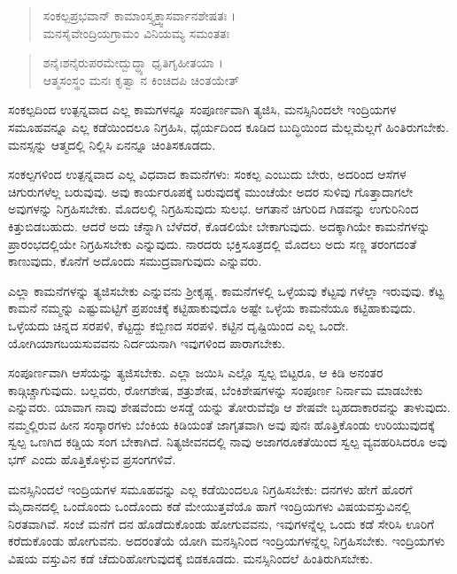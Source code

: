 \begin{verse}
ಸಂಕಲ್ಪಪ್ರಭವಾನ್ ಕಾಮಾಂಸ್ತ್ಯಕ್ತ್ವಾಸರ್ವಾನಶೇಷತಃ ।\\ಮನಸೈವೇಂದ್ರಿಯಗ್ರಾಮಂ ವಿನಿಯಮ್ಯ ಸಮಂತತಃ 
\end{verse}

\begin{verse}
ಶನೈಃಶನೈರುಪರಮೇದ್ಬುದ್ಧ್ಯಾ ಧೃತಿಗೃಹೀತಯಾ ।\\ಆತ್ಮಸಂಸ್ಥಂ ಮನಃ ಕೃತ್ವಾ ನ ಕಿಂಚಿದಪಿ ಚಿಂತಯೇತ್ 
\end{verse}

{\small ಸಂಕಲ್ಪದಿಂದ ಉತ್ಪನ್ನವಾದ ಎಲ್ಲ ಕಾಮಗಳನ್ನೂ ಸಂಪೂರ್ಣವಾಗಿ ತ್ಯಜಿಸಿ, ಮನಸ್ಸಿನಿಂದಲೇ ಇಂದ್ರಿಯಗಳ ಸಮೂಹವನ್ನೂ ಎಲ್ಲ ಕಡೆಯಿಂದಲೂ ನಿಗ್ರಹಿಸಿ, ಧೈರ್ಯದಿಂದ ಕೂಡಿದ ಬುದ್ಧಿಯಿಂದ ಮೆಲ್ಲಮೆಲ್ಲಗೆ ಹಿಂತಿರುಗಬೇಕು. ಮನಸ್ಸನ್ನು ಆತ್ಮದಲ್ಲಿ ನಿಲ್ಲಿಸಿ ಏನನ್ನೂ ಚಿಂತಿಸಕೂಡದು.}

ಸಂಕಲ್ಪಗಳಿಂದ ಉತ್ಪನ್ನವಾದ ಎಲ್ಲ ವಿಧವಾದ ಕಾಮನೆಗಳು: ಸಂಕಲ್ಪ ಎಂಬುದು ಬೇರು, ಅದರಿಂದ ಆಸೆಗಳ ಚಿಗುರುಗಳೆಲ್ಲ ಬರುವುವು. ಅವು ಕಾರ್ಯರೂಪಕ್ಕೆ ಬರುವುದಕ್ಕೆ ಮುಂಚೆಯೇ ಅದರ ಸುಳಿವು ಗೊತ್ತಾದಾಗಲೇ ಅವುಗಳನ್ನು ನಿಗ್ರಹಿಸಬೇಕು. ಮೊದಲಲ್ಲಿ ನಿಗ್ರಹಿಸುವುದು ಸುಲಭ. ಆಗತಾನೆ ಚಿಗುರಿದ ಗಿಡವನ್ನು ಉಗುರಿನಿಂದ ಕಿತ್ತುಬಿಡಬಹುದು. ಆದರೆ ಅದು ಚೆನ್ನಾಗಿ ಬೆಳೆದರೆ, ಕೊಡಲಿಯೇ ಬೇಕಾಗುವುದು. ಅದಕ್ಕಾಗಿಯೇ ಕಾಮನೆಗಳನ್ನು ಪ್ರಾರಂಭದಲ್ಲಿಯೇ ನಿಗ್ರಹಿಸಬೇಕು ಎನ್ನುವುದು. ನಾರದರು ಭಕ್ತಿಸೂತ್ರದಲ್ಲಿ ಮೊದಲು ಅದು ಸಣ್ಣ ತರಂಗದಂತೆ ಕಾಣುವುದು, ಕೊನೆಗೆ ಅದೊಂದು ಸಮುದ್ರವಾಗುವುದು ಎನ್ನುವರು.

ಎಲ್ಲಾ ಕಾಮನೆಗಳನ್ನು ತ್ಯಜಿಸಬೇಕು ಎನ್ನುವನು ಶ್ರೀಕೃಷ್ಣ. ಕಾಮನೆಗಳಲ್ಲಿ ಒಳ್ಳೆಯವು ಕೆಟ್ಟವು ಗಳೆಲ್ಲಾ ಇರುವುವು. ಕೆಟ್ಟ ಕಾಮನೆ ನಮ್ಮನ್ನು ಎಷ್ಟುಮಟ್ಟಿಗೆ ಪ್ರಪಂಚಕ್ಕೆ ಕಟ್ಟಿಹಾಕುವುದೊ ಅಷ್ಟೇ ಒಳ್ಳೆಯ ಕಾಮನೆಯೂ ಕಟ್ಟಿಹಾಕುವುದು. ಒಳ್ಳೆಯದು ಚಿನ್ನದ ಸರಪಳಿ, ಕೆಟ್ಟದ್ದು ಕಬ್ಬಿಣದ ಸರಪಳಿ. ಕಟ್ಟಿನ ದೃಷ್ಟಿಯಿಂದ ಎಲ್ಲ ಒಂದೇ. ಯೋಗಿಯಾಗಬಯಸುವವನು ನಿರ್ದಯನಾಗಿ ಇವುಗಳಿಂದ ಪಾರಾಗಬೇಕು.

ಸಂಪೂರ್ಣವಾಗಿ ಆಸೆಯನ್ನು ತ್ಯಜಿಸಬೇಕು. ಎಲ್ಲಾ ಜಯಿಸಿ ಎಲ್ಲೊ ಸ್ವಲ್ಪ ಬಿಟ್ಟರೂ, ಆ ಕಿಡಿ ಅನಂತರ ಕಾಡ್ಗಿಚ್ಚಾಗುವುದು. ಬಲ್ಲವರು, ರೋಗಶೇಷ, ಶತ್ರುಶೇಷ, ಬೆಂಕಿಶೇಷಗಳನ್ನು ಸಂಪೂರ್ಣ ನಿರ್ನಾಮ ಮಾಡಬೇಕು ಎನ್ನುವರು. ಯಾವಾಗ ನಾವು ಶೇಷವೆಂದು ಅಸಡ್ಡೆ ಯನ್ನು ತೋರುವೆವೊ ಆ ಶೇಷವೇ ಬೃಹದಾಕಾರವನ್ನು ತಾಳುವುದು. ನಮ್ಮಲ್ಲಿರುವ ಹೀನ ಸಂಸ್ಕಾರಗಳು ಬೆಂಕಿಯ ಕಿಡಿಯಂತೆ ಜಾಗೃತವಾಗಿ ಅವು ಪುನಃ ಹೊತ್ತಿಕೊಂಡು ಉರಿಯುವುದಕ್ಕೆ ಸ್ವಲ್ಪ ಒಣಗಿದ ಕಡ್ಡಿಯ ಸಂಗ ಬೇಕಾಗಿದೆ. ನಿತ್ಯಜೀವನದಲ್ಲಿ ನಾವು ಅಜಾಗರೂಕತೆಯಿಂದ ಸ್ವಲ್ಪ ವ್ಯವಹರಿಸಿದರೂ ಅವು ಭಗ್ ಎಂದು ಹೊತ್ತಿಕೊಳ್ಳುವ ಪ್ರಸಂಗಗಳಿವೆ.

ಮನಸ್ಸಿನಿಂದಲೆ ಇಂದ್ರಿಯಗಳ ಸಮೂಹವನ್ನು ಎಲ್ಲ ಕಡೆಯಿಂದಲೂ ನಿಗ್ರಹಿಸಬೇಕು: ದನಗಳು ಹೇಗೆ ಹೊರಗೆ ಮೈದಾನದಲ್ಲಿ ಒಂದೊಂದು ಒಂದೊಂದು ಕಡೆ ಮೇಯುತ್ತವೆಯೊ ಹಾಗೆ ಇಂದ್ರಿಯಗಳು ವಿಷಯವಸ್ತುವಿನಲ್ಲಿ ನಿರತವಾಗಿವೆ. ಸಂಜೆ ಮನೆಗೆ ದನ ಹೊಡೆದುಕೊಂಡು ಹೋಗುವವನು, ಇವುಗಳನ್ನೆಲ್ಲ ಒಂದು ಕಡೆ ಸೇರಿಸಿ ಊರಿಗೆ ಕರೆದುಕೊಂಡು ಹೋಗುವನು. ಅದರಂತೆಯೆ ಯೋಗಿ ಮನಸ್ಸಿನಿಂದ ಇಂದ್ರಿಯಗಳನ್ನೆಲ್ಲ ನಿಗ್ರಹಿಸಬೇಕು. ಇಂದ್ರಿಯಗಳು ವಿಷಯ ವಸ್ತುವಿನ ಕಡೆ ಚೆದುರಿಹೋಗುವುದಕ್ಕೆ ಬಿಡಕೂಡದು. ಮನಸ್ಸಿನಿಂದಲೆ ಹಿಂತಿರುಗಿಸಬೇಕು.


